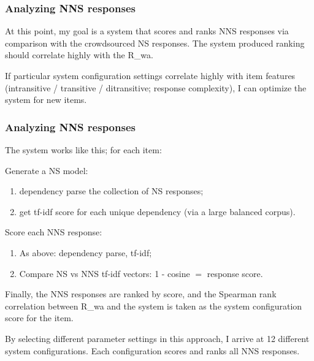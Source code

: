 \documentclass[handout,xcolor={dvipsnames}]{beamer}
\begin{document}
\begin{frame}
\frametitle{Analyzing NNS responses}
\small
At this point, my goal is a system that scores and ranks NNS responses via comparison with the crowdsourced NS responses. The system produced ranking should correlate highly with the R_{wa}.

\bigskip

If particular system configuration settings correlate highly with item features (intransitive / transitive / ditransitive; response complexity), I can optimize the system for new items.
\end{frame}

\begin{frame}
\frametitle{Analyzing NNS responses}
\small
The system works like this; for each item:

\medskip
Generate a NS model:
\begin{enumerate}
\item dependency parse the collection of NS responses;
\item get tf-idf score for each unique dependency (via a large balanced corpus).
\end{enumerate}

\medskip

Score each NNS response:
\begin{enumerate}
\item As above: dependency parse, tf-idf;
\item Compare NS vs NNS tf-idf vectors: 1 - cosine $=$ response score.
\end{enumerate}

Finally, the NNS responses are ranked by score, and the Spearman rank correlation between R_{wa} and the system is taken as the system configuration score for the item.

\bigskip

By selecting different parameter settings in this approach, I arrive at 12 different system configurations. Each configuration scores and ranks all NNS responses.

\end{frame}
\end{document}
